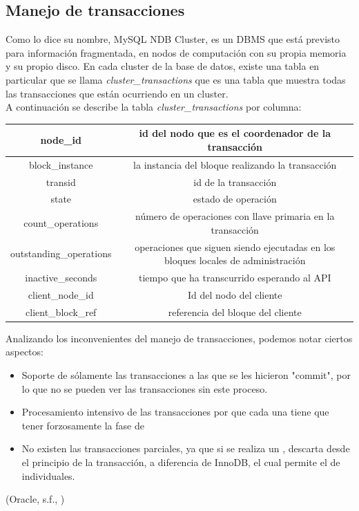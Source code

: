 \documentclass{acmart}
\begin{document}
\subsection{Manejo de transacciones}
Como lo dice su nombre, MySQL NDB Cluster, es un DBMS que está previsto para información fragmentada, en nodos de computación con su propia memoria y su propio disco.
En cada cluster de la base de datos, existe una tabla en particular que se llama \textit{cluster\_transactions} que es una tabla que muestra todas las transacciones que están ocurriendo en un cluster.\\
A continuación se describe la tabla \textit{cluster\_transactions} por columna:

\begin{center}
    \begin{tabular}{|c|c|}
        \hline
        node\_id & id del nodo que es el coordenador de la transacción \\
        \hline
        block\_instance & la instancia del bloque realizando la transacción \\
        \hline
        transid & id de la transacción \\
        \hline
        state & estado de operación\\
        \hline
        count\_operations & número de operaciones con llave primaria en la transacción \\
        \hline
        outstanding\_operations & operaciones que siguen siendo ejecutadas en los bloques locales de administración\\
        \hline
        inactive\_seconds & tiempo que ha transcurrido esperando al API \\
        \hline
        client\_node\_id & Id del nodo del cliente\\
        \hline
        client\_block\_ref & referencia del bloque del cliente\\
        \hline
    \end{tabular}
\end{center}

Analizando los inconvenientes del manejo de transacciones, podemos notar ciertos aspectos:
\begin{itemize}
    \item Soporte de sólamente las transacciones a las que se les hicieron "commit", por lo que no se pueden ver las transacciones sin este proceso.
    \item Procesamiento intensivo de las transacciones por que cada una tiene que tener forzosamente la fase de 
    \item No existen las transacciones parciales, ya que si se realiza un , descarta desde el principio de la transacción, a diferencia de InnoDB, el cual permite el  de  individuales.
\end{itemize}
(Oracle, s.f., \cite{mysqllimittrans})
\end{document}

